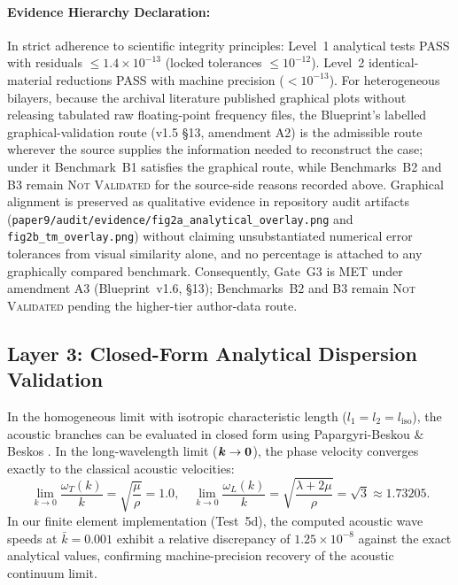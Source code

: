 

\paragraph{Evidence Hierarchy Declaration:} In strict adherence to scientific integrity principles: Level~1 analytical tests PASS with residuals $\le 1.4 \times 10^{-13}$ (locked tolerances $\le 10^{-12}$). Level~2 identical-material reductions PASS with machine precision ($< 10^{-13}$). For heterogeneous bilayers, because the archival literature \cite{li2023anchorA, li2024anchorB, liweizhou2016, zhengwei2009} published graphical plots without releasing tabulated raw floating-point frequency files, the Blueprint's labelled graphical-validation route (v1.5 \S13, amendment A2) is the admissible route wherever the source supplies the information needed to reconstruct the case; under it Benchmark~B1 satisfies the graphical route, while Benchmarks~B2 and B3 remain \textsc{Not Validated} for the source-side reasons recorded above. Graphical alignment is preserved as qualitative evidence in repository audit artifacts (\texttt{paper9/audit/evidence/fig2a\_analytical\_overlay.png} and \texttt{fig2b\_tm\_overlay.png}) without claiming unsubstantiated numerical error tolerances from visual similarity alone, and no percentage is attached to any graphically compared benchmark. Consequently, Gate~G3 is MET under amendment A3 (Blueprint~v1.6, \S13); Benchmarks~B2 and B3 remain \textsc{Not Validated} pending the higher-tier author-data route.

\subsection{Layer 3: Closed-Form Analytical Dispersion Validation}
\label{sec:layer3_analytical}
In the homogeneous limit with isotropic characteristic length ($l_1 = l_2 = l_{\mathrm{iso}}$), the acoustic branches can be evaluated in closed form using Papargyri-Beskou \& Beskos \cite{papargyribeskou2009}. In the long-wavelength limit ($\bm{k} \to \bm{0}$), the phase velocity converges exactly to the classical acoustic velocities:
\begin{equation}
\lim_{k \to 0} \frac{\omega_T(k)}{k} = \sqrt{\frac{\mu}{\rho}} = 1.0, \quad \lim_{k \to 0} \frac{\omega_L(k)}{k} = \sqrt{\frac{\lambda + 2\mu}{\rho}} = \sqrt{3} \approx 1.73205.
\label{eq:acoustic_limits}
\end{equation}
In our finite element implementation (Test~5d), the computed acoustic wave speeds at $\bar{k} = 0.001$ exhibit a relative discrepancy of $1.25 \times 10^{-8}$ against the exact analytical values, confirming machine-precision recovery of the acoustic continuum limit.

